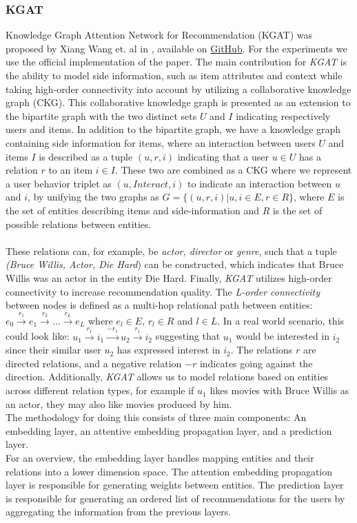 \subsubsection{KGAT}
Knowledge Graph Attention Network for Recommendation (KGAT) was proposed by Xiang Wang et. al in \cite{KGAT}, available on \href{https://github.com/xiangwang1223/knowledge_graph_attention_network}{GitHub}.
For the experiments we use the official implementation of the paper.
The main contribution for \textit{KGAT} is the ability to model side information, such as item attributes and context while taking high-order connectivity into account by utilizing a collaborative knowledge graph (CKG).
This collaborative knowledge graph is presented as an extension to the bipartite graph with the two distinct sets $U$ and $I$ indicating respectively users and items.
In addition to the bipartite graph, we have a knowledge graph containing side information for items, where an interaction between users $U$ and items $I$ is described as a tuple $(u, r, i)$ indicating that a user $u \in U$ has a relation $r$ to an item $i \in I$.
These two are combined as a CKG where we represent a user behavior triplet as $(u, Interact, i)$ to indicate an interaction between $u$ and $i$, by unifying the two graphs as $G = \{(u, r, i) | u, i \in E, r \in R\}$, where $E$ is the set of entities describing items and side-information and $R$ is the set of possible relations between entities.\\\\
These relations can, for example, be \textit{actor, director} or \textit {genre}, such that a tuple \textit{(Bruce Willis, Actor, Die Hard}) can be constructed, which indicates that Bruce Willis was an actor in the entity Die Hard.
Finally, \textit{KGAT} utilizes high-order connectivity to increase recommendation quality.
The \textit{L-order connectivity} between nodes is defined as a multi-hop relational path between entities: $e_0 \overset{r_1}{\rightarrow} e_1 \overset{r_2}{\rightarrow} \dots \overset{r_L}{\rightarrow} e_L$ where $e_l \in E$, $r_l \in R$ and $l \in L$.
In a real world scenario, this could look like: $u_1 \overset{r_1}{\rightarrow} i_1 \overset{-r_1}{\rightarrow} u_2 \overset{r_1}{\rightarrow} i_2$ suggesting that $u_1$ would be interested in $i_2$ since their similar user $u_2$ has expressed interest in $i_2$.
The relations $r$ are directed relations, and a negative relation $-r$ indicates going against the direction.
Additionally, \textit{KGAT} allows us to model relations based on entities across different relation types, for example if $u_1$ likes movies with Bruce Willis as an actor, they may also like movies produced by him.
\\
The methodology for doing this consists of three main components: An embedding layer, an attentive embedding propagation layer, and a prediction layer.\\
For an overview, the embedding layer handles mapping entities and their relations into a lower dimension space.
The attention embedding propagation layer is responsible for generating weights between entities.
The prediction layer is responsible for generating an ordered list of recommendations for the users by aggregating the information from the previous layers.
